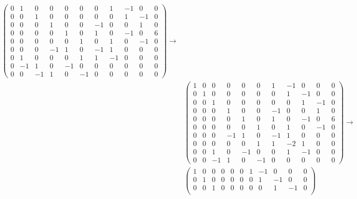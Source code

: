 ﻿\documentclass{book} \usepackage{exsheets} \usepackage{xeCJK}
\begin{document}
\begin{solution}
\begin{align*}
\begin{pmatrix}
                        0&1&0&0&0&0&0&1&-1&0&0\\
                        0&0&1&0&0&0&0&0&1&-1&0\\
                        0&0&0&1&0&0&-1&0&0&1&0\\
                        0&0&0&0&1&0&1&0&-1&0&6\\
                        0&0&0&0&0&1&0&1&0&-1&0\\
                        0&0&0&-1&1&0&-1&1&0&0&0\\
                        0&1&0&0&0&1&1&-1&0&0&0\\
                        0&-1&1&0&-1&0&0&0&0&0&0\\
                        0&0&-1&1&0&-1&0&0&0&0&0
                      \end{pmatrix}\to\\&
                                          \begin{pmatrix}
                                            1&0&0&0&0&0&1&-1&0&0&0\\
                                            0&1&0&0&0&0&0&1&-1&0&0\\
                                            0&0&1&0&0&0&0&0&1&-1&0\\
                                            0&0&0&1&0&0&-1&0&0&1&0\\
                                            0&0&0&0&1&0&1&0&-1&0&6\\
                                            0&0&0&0&0&1&0&1&0&-1&0\\
                                            0&0&0&-1&1&0&-1&1&0&0&0\\
                                            0&0&0&0&0&1&1&-2&1&0&0\\
                                            0&0&1&0&-1&0&0&1&-1&0&0\\
                                            0&0&-1&1&0&-1&0&0&0&0&0
                                          \end{pmatrix}\to\\&
                                                              \begin{pmatrix}
                                                                1&0&0&0&0&0&1&-1&0&0&0\\
                                                                0&1&0&0&0&0&0&1&-1&0&0\\
                                                                0&0&1&0&0&0&0&0&1&-1&0\\

\end{pmatrix}
\end{align*}
\end{solution}
\end{document}
